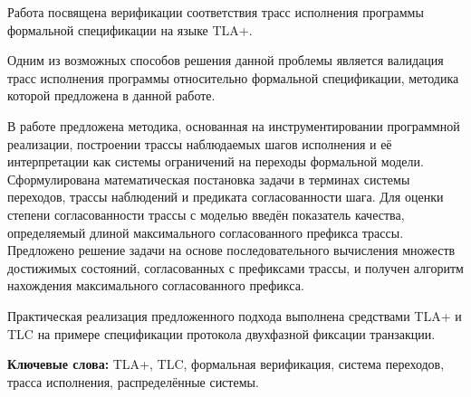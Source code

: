 \abstract

Работа посвящена верификации соответствия трасс исполнения программы формальной
спецификации на языке TLA+.

Одним из возможных способов решения данной проблемы является валидация трасс
исполнения программы относительно формальной спецификации, методика которой
предложена в данной работе.

В работе предложена методика, основанная на инструментировании программной
реализации, построении трассы наблюдаемых шагов исполнения и её интерпретации
как системы ограничений на переходы формальной модели. Сформулирована
математическая постановка задачи в терминах системы переходов, трассы
наблюдений и предиката согласованности шага. Для оценки степени согласованности
трассы с моделью введён показатель качества, определяемый длиной максимального
согласованного префикса трассы. Предложено решение задачи на основе
последовательного вычисления множеств достижимых состояний, согласованных с
префиксами трассы, и получен алгоритм нахождения максимального согласованного
префикса.

Практическая реализация предложенного подхода выполнена средствами TLA+ и TLC
на примере спецификации протокола двухфазной фиксации транзакции.

\textbf{Ключевые слова:} TLA+, TLC, формальная верификация, система переходов,
трасса исполнения, распределённые системы.
